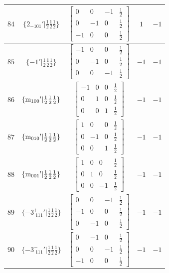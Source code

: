 \documentclass[fleqn,8pt]{jsarticle}
\begin{document}
\begin{longtable}{ccccc}
$ 84 $ & $ \{2{}_{-101}{}'|\frac{1}{2} \frac{1}{2} \frac{1}{2}\} $ & $ \begin{bmatrix} 0 & 0 & -1 & \frac{1}{2} \\ 0 & -1 & 0 & \frac{1}{2} \\ -1 & 0 & 0 & \frac{1}{2} \end{bmatrix} $ & $ 1 $ & $ -1 $ \\ \hline
$ 85 $ & $ \{-1{}'|\frac{1}{2} \frac{1}{2} \frac{1}{2}\} $ & $ \begin{bmatrix} -1 & 0 & 0 & \frac{1}{2} \\ 0 & -1 & 0 & \frac{1}{2} \\ 0 & 0 & -1 & \frac{1}{2} \end{bmatrix} $ & $ -1 $ & $ -1 $ \\ \hline
$ 86 $ & $ \{{\rm m}_{100}{}'|\frac{1}{2} \frac{1}{2} \frac{1}{2}\} $ & $ \begin{bmatrix} -1 & 0 & 0 & \frac{1}{2} \\ 0 & 1 & 0 & \frac{1}{2} \\ 0 & 0 & 1 & \frac{1}{2} \end{bmatrix} $ & $ -1 $ & $ -1 $ \\ \hline
$ 87 $ & $ \{{\rm m}_{010}{}'|\frac{1}{2} \frac{1}{2} \frac{1}{2}\} $ & $ \begin{bmatrix} 1 & 0 & 0 & \frac{1}{2} \\ 0 & -1 & 0 & \frac{1}{2} \\ 0 & 0 & 1 & \frac{1}{2} \end{bmatrix} $ & $ -1 $ & $ -1 $ \\ \hline
$ 88 $ & $ \{{\rm m}_{001}{}'|\frac{1}{2} \frac{1}{2} \frac{1}{2}\} $ & $ \begin{bmatrix} 1 & 0 & 0 & \frac{1}{2} \\ 0 & 1 & 0 & \frac{1}{2} \\ 0 & 0 & -1 & \frac{1}{2} \end{bmatrix} $ & $ -1 $ & $ -1 $ \\ \hline
$ 89 $ & $ \{-3^{+}_{\,\,111}{}'|\frac{1}{2} \frac{1}{2} \frac{1}{2}\} $ & $ \begin{bmatrix} 0 & 0 & -1 & \frac{1}{2} \\ -1 & 0 & 0 & \frac{1}{2} \\ 0 & -1 & 0 & \frac{1}{2} \end{bmatrix} $ & $ -1 $ & $ -1 $ \\ \hline
$ 90 $ & $ \{-3^{-}_{\,\,111}{}'|\frac{1}{2} \frac{1}{2} \frac{1}{2}\} $ & $ \begin{bmatrix} 0 & -1 & 0 & \frac{1}{2} \\ 0 & 0 & -1 & \frac{1}{2} \\ -1 & 0 & 0 & \frac{1}{2} \end{bmatrix} $ & $ -1 $ & $ -1 $ \\ \hline

\end{longtable}
\end{document}
